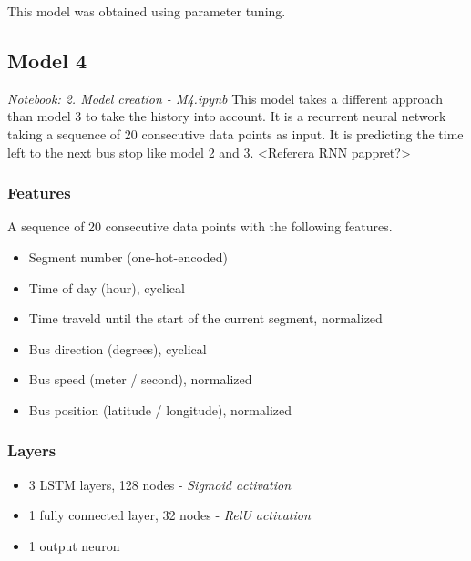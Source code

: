 This model was obtained using parameter tuning.

\subsection{Model 4}
\textit{Notebook: 2. Model creation - M4.ipynb}
\newline
\noindent This model takes a different approach than model 3 to take the history into account. It is a recurrent neural network taking a sequence of 20 consecutive data points as input. It is predicting the time left to the next bus stop like model 2 and 3. 
<Referera RNN pappret?>

\subsubsection{Features}
A sequence of 20 consecutive data points with the following features. 
\begin{itemize}
    \item Segment number (one-hot-encoded)
    \item Time of day (hour), cyclical
    \item Time traveld until the start of the current segment, normalized
    \item Bus direction (degrees), cyclical
    \item Bus speed (meter / second), normalized
    \item Bus position (latitude / longitude), normalized
\end{itemize}

\subsubsection{Layers}

\begin{itemize}
    \item 3 LSTM layers, 128 nodes - \textit{Sigmoid activation}
    \item 1 fully connected layer, 32 nodes - \textit{RelU activation}
    \item 1 output neuron
\end{itemize}


